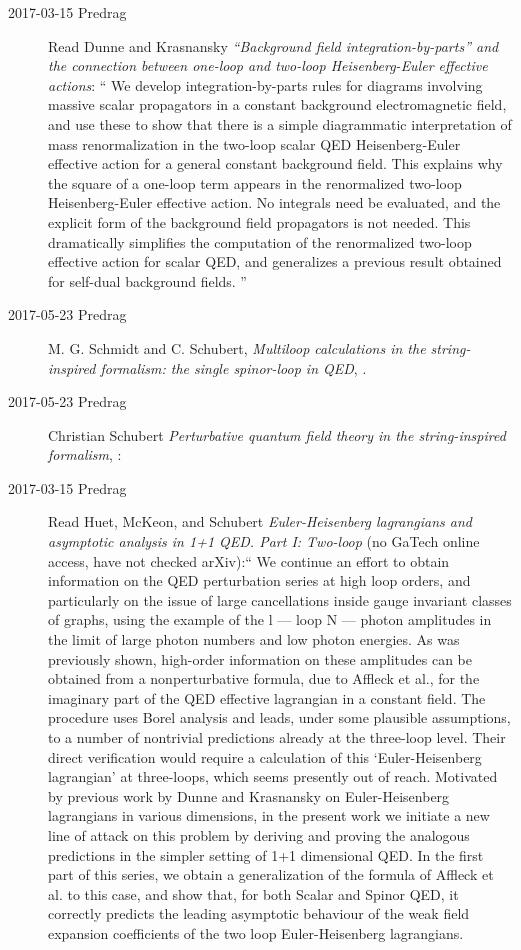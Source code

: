 \begin{description}
\item[2017-03-15 Predrag] Read
Dunne and Krasnansky {\em ``Background field
integration-by-parts'' and the connection between one-loop and two-loop
{Heisenberg-Euler} effective actions}: ``
We develop integration-by-parts rules for diagrams involving massive
scalar propagators in a constant background electromagnetic field, and
use these to show that there is a simple diagrammatic interpretation of
mass renormalization in the two-loop scalar QED Heisenberg-Euler
effective action for a general constant background field. This explains
why the square of a one-loop term appears in the renormalized two-loop
Heisenberg-Euler effective action. No integrals need be evaluated, and
the explicit form of the background field propagators is not needed. This
dramatically simplifies the computation of the renormalized two-loop
effective action for scalar QED, and generalizes a previous result
obtained for self-dual background fields.
''

\item[2017-05-23 Predrag]
M. G. Schmidt and C. Schubert,
{\em Multiloop calculations in the string-inspired formalism: the single
spinor-loop in QED}, .

\item[2017-05-23 Predrag]
Christian Schubert
{\em Perturbative quantum field theory in the string-inspired formalism},
:

\item[2017-03-15 Predrag] Read
Huet, McKeon, and Schubert
{\em {Euler-Heisenberg} lagrangians and asymptotic analysis in 1+1 {QED. Part I: Two}-loop}
(no GaTech online access, have not checked arXiv):``
We continue an effort to obtain information on the QED perturbation
series at high loop orders, and particularly on the issue of large
cancellations inside gauge invariant classes of graphs, using the example
of the l --- loop N --- photon amplitudes in the limit of large photon
numbers and low photon energies. As was previously shown, high-order
information on these amplitudes can be obtained from a nonperturbative
formula, due to Affleck et al., for the imaginary part of the QED
effective lagrangian in a constant field. The procedure uses Borel
analysis and leads, under some plausible assumptions, to a number of
nontrivial predictions already at the three-loop level. Their direct
verification would require a calculation of this `Euler-Heisenberg
lagrangian' at three-loops, which seems presently out of reach. Motivated
by previous work by Dunne and Krasnansky on Euler-Heisenberg
lagrangians in various dimensions, in the present work we initiate a new
line of attack on this problem by deriving and proving the analogous
predictions in the simpler setting of 1+1 dimensional QED. In the first
part of this series, we obtain a generalization of the formula of Affleck
et al. to this case, and show that, for both Scalar and Spinor QED, it
correctly predicts the leading asymptotic behaviour of the weak field
expansion coefficients of the two loop Euler-Heisenberg lagrangians.


\end{description}
